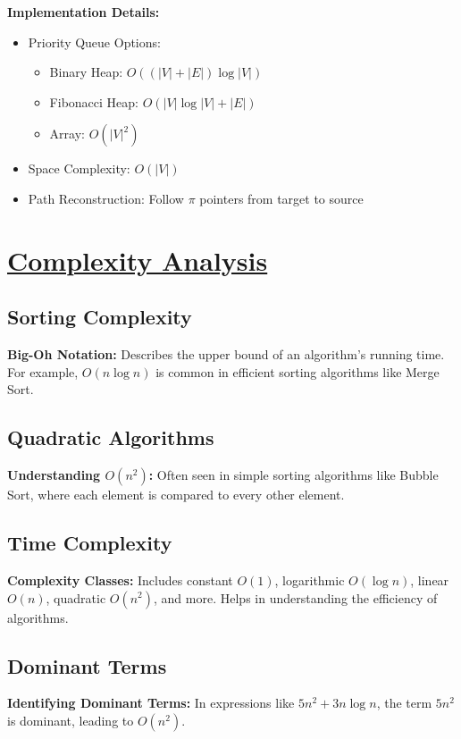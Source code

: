 \textbf{Implementation Details:}
\begin{itemize}[noitemsep]
    \item Priority Queue Options:
        \begin{itemize}[noitemsep]
            \item Binary Heap: $O((|V| + |E|)\log |V|)$
            \item Fibonacci Heap: $O(|V|\log |V| + |E|)$
            \item Array: $O(|V|^2)$
        \end{itemize}
    \item Space Complexity: $O(|V|)$
    \item Path Reconstruction: Follow $\pi$ pointers from target to source
\end{itemize}

\clearpage
\section{\texorpdfstring{\underline{Complexity Analysis}}{Complexity Analysis}}

\subsection{Sorting Complexity}
\textbf{Big-Oh Notation:} Describes the upper bound of an algorithm's running time. For example, $O(n \log n)$ is common in efficient sorting algorithms like Merge Sort.

\subsection{Quadratic Algorithms}
\textbf{Understanding $O(n^2)$:} Often seen in simple sorting algorithms like Bubble Sort, where each element is compared to every other element.

\subsection{Time Complexity}
\textbf{Complexity Classes:} Includes constant $O(1)$, logarithmic $O(\log n)$, linear $O(n)$, quadratic $O(n^2)$, and more. Helps in understanding the efficiency of algorithms.

\subsection{Dominant Terms}
\textbf{Identifying Dominant Terms:} In expressions like $5n^2 + 3n \log n$, the term $5n^2$ is dominant, leading to $O(n^2)$.

